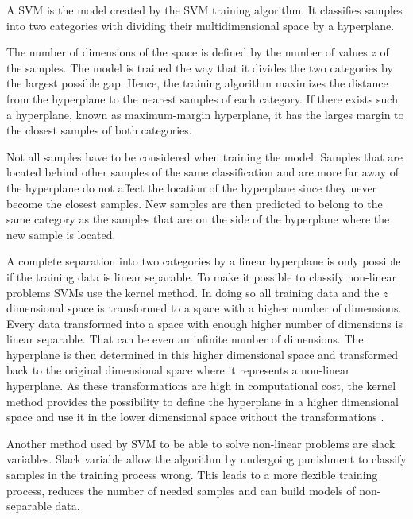 A \acf{SVM} is the model created by the \ac{SVM} training algorithm.
It classifies samples into two categories with dividing their multidimensional space by a hyperplane. %

The number of dimensions of the space is defined by the number of values $z$ of the samples.
The model is trained the way that it divides the two categories by the largest possible gap. %
Hence, the training algorithm maximizes the distance from the hyperplane to the nearest samples of each category.
If there exists such a hyperplane, known as maximum-margin hyperplane, it has the larges margin to the closest samples of both categories. %

Not all samples have to be considered when training the model.
Samples that are located behind other samples of the same classification and are more far away of the hyperplane do not affect the location of the hyperplane since they never become the closest samples. %
New samples are then predicted to belong to the same category as the samples that are on the side of the hyperplane where the new sample is located.

A complete separation into two categories by a linear hyperplane is only possible if the training data is linear separable.
To make it possible to classify non-linear problems \acp{SVM} use the kernel method. %
In doing so all training data and the $z$ dimensional space is transformed to a space with a higher number of dimensions.
Every data transformed into a space with enough higher number of dimensions is linear separable.
That can be even an infinite number of dimensions. %
The hyperplane is then determined in this higher dimensional space and transformed back to the original dimensional space where it represents a non-linear hyperplane. %
As these transformations are high in computational cost, the kernel method provides the possibility to define the hyperplane in a higher dimensional space and use it in the lower dimensional space without the transformations \cite{2016SupportMachine}.

Another method used by \ac{SVM} to be able to solve non-linear problems are slack variables.
Slack variable allow the algorithm by undergoing punishment to classify samples in the training process wrong. %
This leads to a more flexible training process, reduces the number of needed samples and can build models of non-separable data.

